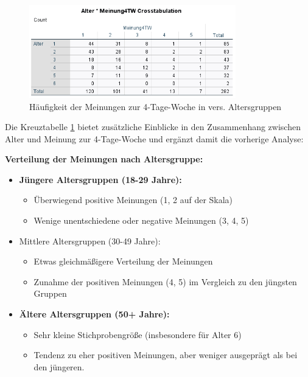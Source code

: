 \begin{figure}[h]
    \centering
    \includegraphics[width=0.8\textwidth]{04_Artefakte/01_Abbildungen/hypothese_1/h1_tabelle_alter.png}
    \caption{Häufigkeit der Meinungen zur 4-Tage-Woche in vers. Altersgruppen}
    \label{fig:h1_tabelle_alter}
\end{figure}

Die Kreuztabelle \ref*{fig:h1_tabelle_alter} bietet zusätzliche Einblicke in den Zusammenhang zwischen Alter und Meinung zur 
4-Tage-Woche und ergänzt damit die vorherige Analyse:

\textbf{Verteilung der Meinungen nach Altersgruppe:}

\begin{itemize}
    \item \textbf{Jüngere Altersgruppen (18-29 Jahre):}
    \begin{itemize}
        \item Überwiegend positive Meinungen (1, 2 auf der Skala)
        \item Wenige unentschiedene oder negative Meinungen (3, 4, 5)
    \end{itemize}
    \item Mittlere Altersgruppen (30-49 Jahre):
    \begin{itemize}
        \item Etwas gleichmäßigere Verteilung der Meinungen 
        \item Zunahme der positiven Meinungen (4, 5) im Vergleich zu den jüngsten Gruppen
    \end{itemize}
    \item \textbf{Ältere Altersgruppen (50+ Jahre):}
    \begin{itemize}
        \item Sehr kleine Stichprobengröße (insbesondere für Alter 6) 
        \item Tendenz zu eher positiven Meinungen, aber weniger ausgeprägt als bei den jüngeren.
    \end{itemize}
\end{itemize}

